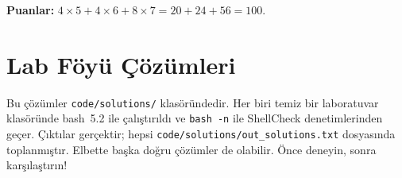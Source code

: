 \documentclass[11pt,a4paper]{article}
\newcommand{\cmd}[1]{\texttt{#1}}
\begin{document}
\textbf{Puanlar:} $4 \times 5 + 4 \times 6 + 8 \times 7 = 20 + 24 + 56 = 100$.

\section{Lab Föyü Çözümleri}

Bu çözümler \texttt{code/solutions/} klasöründedir. Her biri temiz bir laboratuvar klasöründe bash~5.2 ile çalıştırıldı ve \cmd{bash -n} ile ShellCheck denetimlerinden geçer. Çıktılar gerçektir; hepsi \nolinkurl{code/solutions/out_solutions.txt} dosyasında toplanmıştır. Elbette başka doğru çözümler de olabilir. Önce deneyin, sonra karşılaştırın!

\newcommand{\sol}[4]{\Needspace{6\baselineskip}\par\smallskip{\headfont\bfseries\color{mintdeep}#1}}
\end{document}
